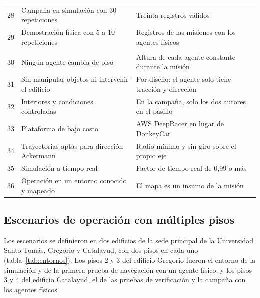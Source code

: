 \begin{table}[H]
\begin{tabular}{@{}c>{\raggedright\arraybackslash}p{}>{\raggedright\arraybackslash}p{}@{}}
    28 & Campaña en simulación con 30 repeticiones & Treinta registros válidos \\
    29 & Demostración física con 5 a 10 repeticiones & Registros de las misiones con los agentes físicos \\ \addlinespace
    \multicolumn{3}{@{}l}{\textit{Restricciones del alcance}} \\
    30 & Ningún agente cambia de piso & Altura de cada agente constante durante la misión \\
    31 & Sin manipular objetos ni intervenir el edificio & Por diseño: el agente solo tiene tracción y dirección \\
    32 & Interiores y condiciones controladas & En la campaña, solo los dos autores en el pasillo \\
    33 & Plataforma de bajo costo & AWS DeepRacer en lugar de DonkeyCar \\
    34 & Trayectorias aptas para dirección Ackermann & Radio mínimo y sin giro sobre el propio eje \\
    35 & Simulación a tiempo real & Factor de tiempo real de 0,99 o más \\
    36 & Operación en un entorno conocido y mapeado & El mapa es un insumo de la misión \\ \bottomrule
  \end{tabular}
\end{table}

\subsection{Escenarios de operación con múltiples pisos}
\label{sec:entornos}

Los escenarios se definieron en dos edificios de la sede principal de la Universidad Santo Tomás, Gregorio y Catalayud, con dos pisos en cada uno (tabla~\ref{tab:entornos}). Los pisos 2 y 3 del edificio Gregorio fueron el entorno de la simulación y de la primera prueba de navegación con un agente físico, y los pisos 3 y 4 del edificio Catalayud, el de las pruebas de verificación y la campaña con los agentes físicos.

